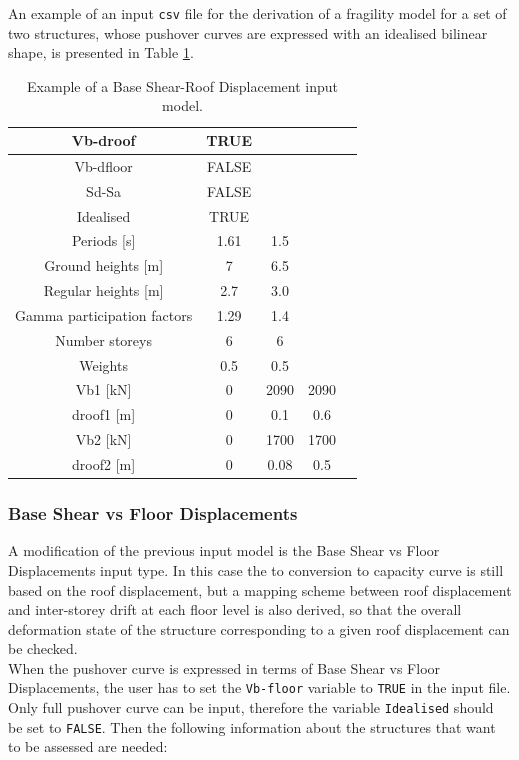 An example of an input \verb=csv= file for the derivation of a fragility model for a set of two structures, whose pushover curves are expressed with an idealised bilinear shape, is presented in Table \ref{table:Vb-droof_input}.

\begin {table}[htb]
\caption{Example of a Base Shear-Roof Displacement input model.}
\label{table:Vb-droof_input}
\begin{center}
  \begin{tabular}{ | c | c | c | c | c |}
  \hline
    Vb-droof & TRUE &  &  \\ \hline
    Vb-dfloor & FALSE & & \\ \hline
    Sd-Sa & FALSE & & \\ \hline
    Idealised & TRUE & & \\ \hline
    Periods [s] & 1.61 & 1.5 & \\ \hline
    Ground heights [m] & 7 & 6.5 & \\ \hline
    Regular heights [m] & 2.7 & 3.0 & \\ \hline
    Gamma participation factors & 1.29 & 1.4 & \\ \hline
    Number storeys & 6 & 6 & \\ \hline
    Weights & 0.5 & 0.5 & \\ \hline
    Vb1 [kN] & 0 & 2090 & 2090 \\ \hline
    droof1 [m] & 0 & 0.1 & 0.6 \\ \hline
    Vb2 [kN] & 0 & 1700 & 1700 \\ \hline
    droof2 [m] & 0 & 0.08 & 0.5 \\ \hline
  \end{tabular}
\end{center}
\end{table}

\subsubsection{Base Shear vs Floor Displacements}
\label{subsubsec:VB-Dfloor}
A modification of the previous input model is the Base Shear vs Floor Displacements input type. In this case the to conversion to capacity curve is still based on the roof displacement, but a mapping scheme between roof displacement and inter-storey drift at each floor level is also derived, so that the overall deformation state of the structure corresponding to a given roof displacement can be checked.\\
When the pushover curve is expressed in terms of Base Shear vs Floor Displacements, the user has to set the \verb=Vb-floor= variable to \verb=TRUE= in the input file. Only full pushover curve can be input, therefore the variable \verb=Idealised= should be set to \verb=FALSE=. Then the following information about the structures that want to be assessed are needed:\\

